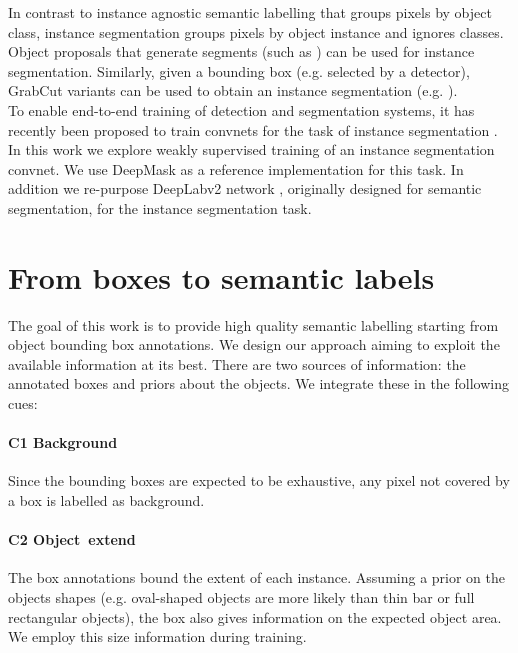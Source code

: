 \documentclass[10pt,english,british,twocolumn]{article}
\begin{document}
In contrast to instance agnostic semantic labelling that groups pixels
by object class, instance segmentation groups pixels by object instance
and ignores classes.\\
Object proposals \cite{PontTuset2015Iccv,Hosang2015Pami} that generate
segments (such as \cite{PontTuset2015ArxivMcg,Krahenbuhl2015Cvpr})
can be used for instance segmentation. Similarly, given a bounding
box (e.g. selected by a detector), GrabCut \cite{Rother2004TogGrabcut}
variants can be used to obtain an instance segmentation (e.g. \cite{Lempitsky2009Iccv,Cheng2015CgfDenseCut,Taniai2015Cvpr,Tang2015IccvSecretGrabCut,Yu2015ArXivLooseCut}).\\
To enable end-to-end training of detection and segmentation systems,
it has recently been proposed to train convnets for the task of instance
segmentation \cite{Hariharan2015Cvpr,Pinheiro2015Nips}. In this work
we explore weakly supervised training of an instance segmentation
convnet. We use DeepMask \cite{Pinheiro2015Nips} as a reference implementation
for this task. In addition we re-purpose Deep\-Lab\-v2 network \cite{Chen2016ArxivDeeplabv2},
originally designed for semantic segmentation, for the instance segmentation
task.

\section{\label{sec:Baselines-and-approach}From boxes to semantic labels}

The goal of this work is to provide high quality semantic labelling
starting from object bounding box annotations. We design our approach
aiming to exploit the available information at its best. There are
two sources of information: the annotated boxes and priors about the
objects. We integrate these in the following cues:

\paragraph{C1 Background}

Since the bounding boxes are expected to be exhaustive, any pixel
not covered by a box is labelled as background.

\paragraph{C2 Object~extend}

The box annotations bound the extent of each instance. Assuming a
prior on the objects shapes (e.g. oval-shaped objects are more likely
than thin bar or full rectangular objects), the box also gives information
on the expected object area. We employ this size information during
training.
\end{document}
